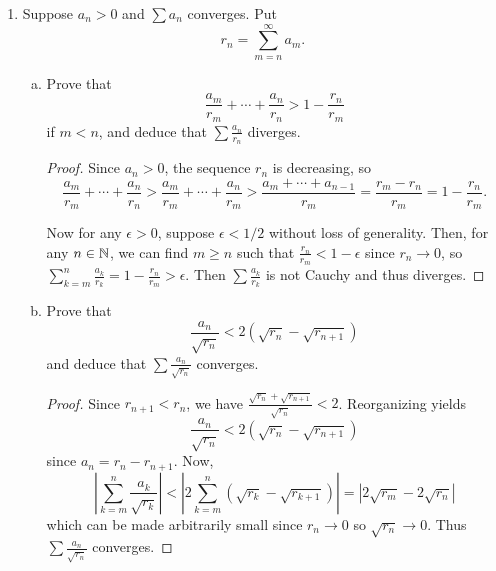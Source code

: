 \begin{enumerate}
\begin{enumerate}[(a)]
\item What can be said about
\[
	\sum \frac{a_n}{1 + na_n} \text{ and } \sum \frac{a_n}{1 + n^2 a_n} \text{?}
\]

\begin{proof}
The first series converges for some $a_n$ and diverges for some other $a_n$. But $\frac{a_n}{1 + n^2 a_n} < \frac{a_n}{n^2 a_n} = \frac{1}{n^2}$ so the second series converges by the comparison test and the $p$-test.
\end{proof}
\end{enumerate}

\item %
Suppose $a_n > 0$ and $\sum a_n$ converges. Put
\[
	r_n = \sum_{m=n}^{\infty} a_m.
\]
\begin{enumerate}[(a)]
\item Prove that
\[
	\frac{a_m}{r_m} + \dotsb + \frac{a_n}{r_n} > 1 - \frac{r_n}{r_m}
\]
if $m < n$, and deduce that $\sum \frac{a_n}{r_n}$ diverges.

\begin{proof}
Since $a_n > 0$, the sequence $r_n$ is decreasing, so
\[
	\frac{a_m}{r_m} + \dotsb + \frac{a_n}{r_n} > \frac{a_m}{r_m} + \dotsb + \frac{a_n}{r_m} > \frac{a_m + \dotsb + a_{n-1}}{r_m} = \frac{r_m - r_n}{r_m} = 1 - \frac{r_n}{r_m}.
\]

Now for any $\epsilon > 0$, suppose $\epsilon < 1/2$ without loss of generality. Then, for any $n \in \mathbb{N}$, we can find $m \ge n$ such that $\frac{r_n}{r_m} < 1 - \epsilon$ since $r_n \to 0$, so $\sum_{k=m}^{n} \frac{a_k}{r_k} = 1 - \frac{r_n}{r_m} > \epsilon$. Then $\sum \frac{a_k}{r_k}$ is not Cauchy and thus diverges.
\end{proof}
\item Prove that
\[
	\frac{a_n}{\sqrt{r_n}} < 2 (\sqrt{r_n} - \sqrt{r_{n+1}})
\]
and deduce that $\sum \frac{a_n}{\sqrt{r_n}}$ converges.

\begin{proof}
Since $r_{n+1} < r_n$, we have $\frac{\sqrt{r_n} + \sqrt{r_{n+1}}}{\sqrt{r_n}} < 2$. Reorganizing yields
\[
    \frac{a_n}{\sqrt{r_n}} < 2 (\sqrt{r_n} - \sqrt{r_{n+1}})        
\]
since $a_n = r_n - r_{n+1}$. Now,
\[
    \left|\sum_{k=m}^{n} \frac{a_k}{\sqrt{r_k}}\right| < \left|2\sum_{k=m}^{n} (\sqrt{r_k} - \sqrt{r_{k+1}})\right| = \left|2\sqrt{r_m} - 2\sqrt{r_n}\right|
\]
which can be made arbitrarily small since $r_n \to 0$ so $\sqrt{r_n} \to 0$. Thus $\sum \frac{a_n}{\sqrt{r_n}}$ converges.
\end{proof}
\end{enumerate}


\end{enumerate}
